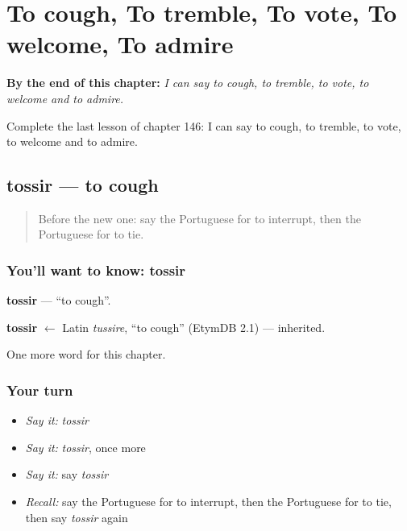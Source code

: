 
\chapter{To cough, To tremble, To vote, To welcome, To admire}
\label{ch:pt-to-cough-to-tremble-to-vote-to-welcome-to-admire}

\begin{chapteropening}
\textbf{By the end of this chapter:} \emph{I can say to cough, to tremble, to vote, to welcome and to admire.}

Complete the last lesson of chapter 146: I can say to cough, to tremble, to vote, to welcome and to admire.
\end{chapteropening}

\section[tossir]{tossir — to cough}

\label{lesson:PT-C146-tossir}



\begin{quote}
Before the new one: say the Portuguese for to interrupt, then the Portuguese for to tie.
\end{quote}

\subsection*{You'll want to know: tossir}
\textbf{tossir} — \textquotedblleft{}to cough\textquotedblright{}.

\begin{cousinweb}
\textbf{tossir} $\leftarrow$ Latin \emph{tussire}, \textquotedblleft{}to cough\textquotedblright{} (EtymDB 2.1) — inherited.
\end{cousinweb}

\begin{grammarlens}[title={What you've built}]
One more word for this chapter.
\end{grammarlens}

\subsection*{Your turn}
\begin{itemize}
\raggedright
  \item \emph{Say it:} \emph{tossir}
  \item \emph{Say it:} \emph{tossir}, once more
  \item \emph{Say it:} say \emph{tossir}
  \item \emph{Recall:} say the Portuguese for to interrupt, then the Portuguese for to tie, then say \emph{tossir} again
\end{itemize}

